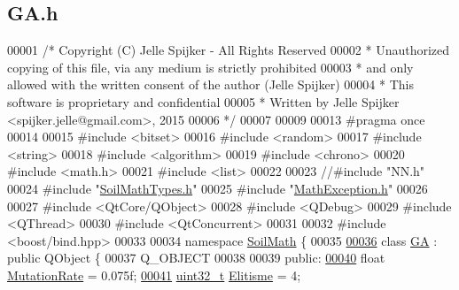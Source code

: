 \hypertarget{_g_a_8h_source}{}\subsection{G\+A.\+h}
\label{_g_a_8h_source}

\begin{DoxyCode}
00001 \textcolor{comment}{/* Copyright (C) Jelle Spijker - All Rights Reserved}
00002 \textcolor{comment}{ * Unauthorized copying of this file, via any medium is strictly prohibited}
00003 \textcolor{comment}{ * and only allowed with the written consent of the author (Jelle Spijker)}
00004 \textcolor{comment}{ * This software is proprietary and confidential}
00005 \textcolor{comment}{ * Written by Jelle Spijker <spijker.jelle@gmail.com>, 2015}
00006 \textcolor{comment}{ */}
00007 
00009 
00013 \textcolor{preprocessor}{#pragma once}
00014 
00015 \textcolor{preprocessor}{#include <bitset>}
00016 \textcolor{preprocessor}{#include <random>}
00017 \textcolor{preprocessor}{#include <string>}
00018 \textcolor{preprocessor}{#include <algorithm>}
00019 \textcolor{preprocessor}{#include <chrono>}
00020 \textcolor{preprocessor}{#include <math.h>}
00021 \textcolor{preprocessor}{#include <list>}
00022 
00023 \textcolor{comment}{//#include "NN.h"}
00024 \textcolor{preprocessor}{#include "\hyperlink{_soil_math_types_8h}{SoilMathTypes.h}"}
00025 \textcolor{preprocessor}{#include "\hyperlink{_math_exception_8h}{MathException.h}"}
00026 
00027 \textcolor{preprocessor}{#include <QtCore/QObject>}
00028 \textcolor{preprocessor}{#include <QDebug>}
00029 \textcolor{preprocessor}{#include <QThread>}
00030 \textcolor{preprocessor}{#include <QtConcurrent>}
00031 
00032 \textcolor{preprocessor}{#include <boost/bind.hpp>}
00033 
00034 \textcolor{keyword}{namespace }\hyperlink{namespace_soil_math}{SoilMath} \{
00035 
\hypertarget{_g_a_8h_source_l00036}{}\hyperlink{class_soil_math_1_1_g_a}{00036} \textcolor{keyword}{class }\hyperlink{class_soil_math_1_1_g_a}{GA} : \textcolor{keyword}{public} QObject \{
00037   Q\_OBJECT
00038 
00039 \textcolor{keyword}{public}:
\hypertarget{_g_a_8h_source_l00040}{}\hyperlink{class_soil_math_1_1_g_a_a82996d544a2f25b5a75ae8ba1e82d661}{00040}   \textcolor{keywordtype}{float} \hyperlink{class_soil_math_1_1_g_a_a82996d544a2f25b5a75ae8ba1e82d661}{MutationRate} = 0.075f; 
\hypertarget{_g_a_8h_source_l00041}{}\hyperlink{class_soil_math_1_1_g_a_a381e62f146aacfa86fec6e0dc40053ab}{00041}   \hyperlink{_soil_math_types_8h_a435d1572bf3f880d55459d9805097f62}{uint32\_t} \hyperlink{class_soil_math_1_1_g_a_a381e62f146aacfa86fec6e0dc40053ab}{Elitisme} = 4;       

\end{DoxyCode}
